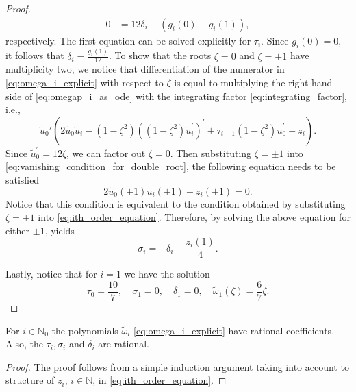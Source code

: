 \begin{proof}
\begin{align}
  0 & = 12 \delta_i - (g_i(0) - g_i(1)),
\end{align}
respectively. The first equation can be solved explicitly for $\tau_i$. Since
$g_i(0)=0$, it follows that $\delta_i = \frac{g_i(1)}{12}$. To show that the
roots $\zeta=0$ and $\zeta=\pm1$ have multiplicity two, we notice that
differentiation of the numerator in \cref{eq:omega_i_explicit} with respect to
$\zeta$ is equal to multiplying the right-hand side of \cref{eq:omegap_i_as_ode}
with the integrating factor
\cref{eq:integrating_factor}, i.e.,
\begin{equation}
    \label{eq:vanishing_condition_for_double_root}
    \tilde u_0' \left( 2 \tilde u_0\tilde u_i - (1-\zeta^2)\left((1-\zeta^2)\tilde u_i^\prime\right)^\prime
    + \tau_{i-1} \left(1- \zeta^2\right) \tilde u_0^\prime - z_i \right).
\end{equation}
Since $\tilde u_0^\prime = 12 \zeta$, we can factor out $\zeta=0$. Then substituting
$\zeta=\pm1$ into \cref{eq:vanishing_condition_for_double_root}, the following
equation needs to be satisfied
\begin{equation*}
    2 \tilde u_0(\pm1)\tilde u_i(\pm1) + z_i(\pm1) = 0.
\end{equation*}
Notice that this condition is equivalent to the condition obtained by
substituting $\zeta=\pm1$ into \cref{eq:ith_order_equation}. Therefore, by
solving the above equation for either $\pm 1$, yields
\begin{equation}
    \label{eq:sigma_i}
    \sigma_i = -\delta_i - \frac{z_i(1)}{4}.
\end{equation}

Lastly, notice that for $i=1$ we have the solution
\[
\tau_0 = \frac{10}{7}, \quad \sigma_1=0, \quad \delta_1=0,
				\quad \tilde\omega_1(\zeta) = \frac{6}{7} \zeta.
\]
\end{proof}

\begin{corollary}
    \label{corllary:rational_coefficients}
    For $i\in \mathbb N_0$ the polynomials $\tilde \omega_i$ 
    \cref{eq:omega_i_explicit} have rational
    coefficients. Also, the $\tau_i, \sigma_i$ and  $\delta_i$ are rational.
\end{corollary}

\begin{proof}
    The proof follows from a simple induction argument taking into account to
    structure of $z_i$, $i\in\mathbb N$, in \cref{eq:ith_order_equation}.
\end{proof}

